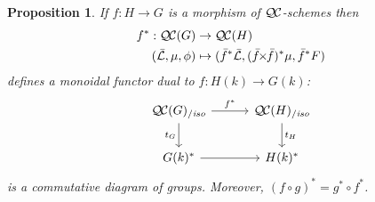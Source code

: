 \documentclass[11pt]{amsart}
\theoremstyle{plain}
\newtheorem{proposition}[theorem]{Proposition}
\theoremstyle{definition}
\theoremstyle{remark}
\newcommand{\Fq}{k}
\newcommand{\gqcs}[1]{{\mathcal{\bar #1}}}
\newcommand{\QC}{{\mathcal{Q\hskip-0.8pt C}}}
\newcommand{\QCiso}[1]{\QC(#1)_{/\textit{iso}}}
\newcommand{\trFrob}[1]{t_{#1}}
\renewcommand{\bf}{\bar{f}}
\newcommand{\tight}[3]{\hspace{-#1pt}{#2}\hspace{-#3pt}}
\newcommand{\bfxf}{\text{$\bar{f} \tight{1}{\times}{1} \bar{f}$}}
\begin{document}
\begin{proposition}\label{prop:pullback}
  If $f : H\to G$ is a morphism of $\QC$-schemes then
  \begin{align*}
  f^* : \QC(G) &\to \QC(H) \\
  (\gqcs{L},\mu,\phi) &\mapsto (\bf^*\gqcs{L},(\bfxf)^*\mu,\bf^*F)
  \end{align*}
  defines a monoidal functor dual to $f \colon H(\Fq) \to G(\Fq)$:
  \[
  \begin{tikzcd}[row sep=20, column sep=30]
   \QCiso{G} \rar{f^*} \arrow[swap]{d}{\trFrob{G}} & \QCiso{H} \dar{\trFrob{H}} \\
   G(\Fq)^* \rar & H(\Fq)^*
  \end{tikzcd}
  \]
  is a commutative diagram of groups.  Moreover, $(f\circ g)^* = g^* \circ f^*$.
\end{proposition}
\end{document}
